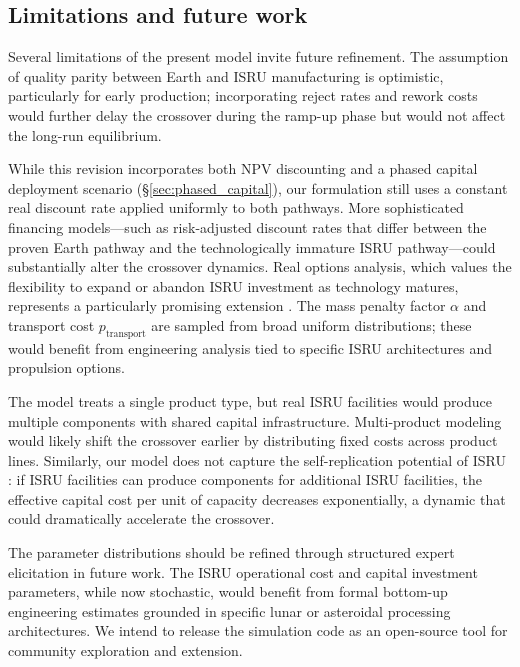 \documentclass[preprint,12pt]{elsarticle}
\begin{document}
\subsection{Limitations and future work}

Several limitations of the present model invite future refinement. The assumption of quality parity between Earth and ISRU manufacturing is optimistic, particularly for early production; incorporating reject rates and rework costs would further delay the crossover during the ramp-up phase but would not affect the long-run equilibrium.

While this revision incorporates both NPV discounting and a phased capital deployment scenario (\S\ref{sec:phased_capital}), our formulation still uses a constant real discount rate applied uniformly to both pathways. More sophisticated financing models---such as risk-adjusted discount rates that differ between the proven Earth pathway and the technologically immature ISRU pathway---could substantially alter the crossover dynamics. Real options analysis, which values the flexibility to expand or abandon ISRU investment as technology matures, represents a particularly promising extension \cite{sowers2021}. The mass penalty factor $\alpha$ and transport cost $p_{\mathrm{transport}}$ are sampled from broad uniform distributions; these would benefit from engineering analysis tied to specific ISRU architectures and propulsion options.

The model treats a single product type, but real ISRU facilities would produce multiple components with shared capital infrastructure. Multi-product modeling would likely shift the crossover earlier by distributing fixed costs across product lines. Similarly, our model does not capture the self-replication potential of ISRU \cite{metzger2013}: if ISRU facilities can produce components for additional ISRU facilities, the effective capital cost per unit of capacity decreases exponentially, a dynamic that could dramatically accelerate the crossover.

The parameter distributions should be refined through structured expert elicitation in future work. The ISRU operational cost and capital investment parameters, while now stochastic, would benefit from formal bottom-up engineering estimates grounded in specific lunar or asteroidal processing architectures. We intend to release the simulation code as an open-source tool for community exploration and extension.

\end{document}
